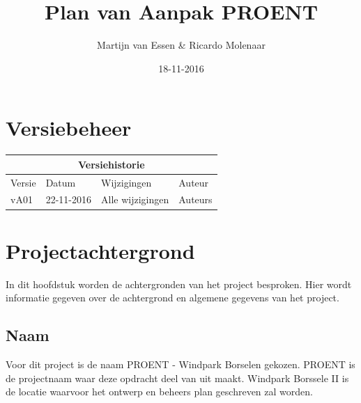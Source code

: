 \documentclass[numbers=endperiod]{scrartcl}
\title{Plan van Aanpak PROENT}
\date{18-11-2016}
\author{Martijn van Essen \& Ricardo Molenaar}
\begin{document}
	
	\newpage
	
	\setcounter{secnumdepth}{0} %
	\section{Versiebeheer}
	
	\begin{center}
		\begin{tabular}{| p{4cm} | l | p{7cm} | l |}
			\hline
			
			\multicolumn{4}{|c|}{
				\cellcolor{hhs_theme_heading_2}
				Versiehistorie
			}  \\ \hline
			
			Versie 	& Datum 		& Wijzigingen 	& Auteur \\ \hline
			vA01 	& 22-11-2016 	& Alle wijzigingen 
			&Auteurs\\ \hline
		\end{tabular}
	\end{center}
	\newpage
	
	\renewcommand{\contentsname}{Inhoudsopgave} %
	\tableofcontents
	\newpage
	
	\setcounter{secnumdepth}{3}%

	\section{Projectachtergrond}
	In dit hoofdstuk worden de achtergronden van het project besproken. Hier wordt informatie gegeven over de achtergrond en algemene gegevens van het project.
	
	\subsection{Naam}
	Voor dit project is de naam PROENT - Windpark Borselen gekozen. PROENT is de projectnaam waar deze opdracht deel van uit maakt. Windpark Borssele II is de locatie waarvoor het ontwerp en beheers plan geschreven zal worden.
\end{document}

